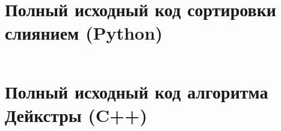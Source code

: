 \chapter{Полный исходный код сортировки слиянием (Python)}
\label{app:merge-sort-full}

\begin{listing}[H]
  \inputminted{python}{code/merge_sort.py}
  \caption{Полная реализация сортировки слиянием на Python}
  \label{code:merge-sort}
\end{listing}

\chapter{Полный исходный код алгоритма Дейкстры (C++)}
\label{app:dijkstra-full}

\begin{listing}[H]
  \inputminted{cpp}{code/dijkstra.cpp}
  \caption{Полная реализация алгоритма Дейкстры на C++}
  \label{code:dijkstra}
\end{listing}
